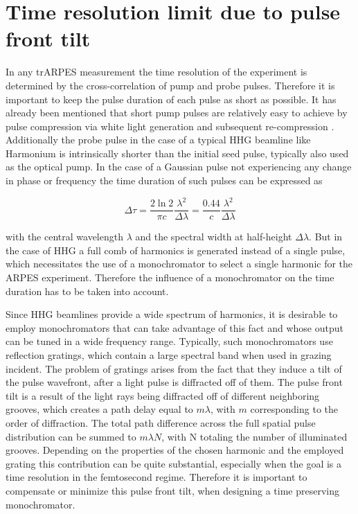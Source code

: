 \section{Time resolution limit due to pulse front tilt}

In any trARPES measurement the time resolution of the experiment is determined by the cross-correlation of pump and probe pulses.
Therefore it is important to keep the pulse duration of each pulse as short as possible.
It has already been mentioned that short pump pulses are relatively easy to achieve by pulse compression via white light generation and subsequent re-compression \cite{nisoli_compression_1997}.
Additionally the probe pulse in the case of a typical HHG beamline like Harmonium is intrinsically shorter than the initial seed pulse, typically also used as the optical pump.
In the case of a Gaussian pulse not experiencing any change in phase or frequency the time duration of such pulses can be expressed as

\begin{equation}
	\Delta\tau = \frac{2 \ln{2}}{\pi c}\frac{\lambda^2}{\Delta\lambda} = \frac{0.44}{c}\frac{\lambda^2}{\Delta\lambda}
\end{equation}

with the central wavelength $\lambda$ and the spectral width at half-height $\Delta\lambda$.
But in the case of HHG a full comb of harmonics is generated instead of a single pulse, which necessitates the use of a monochromator to select a single harmonic for the ARPES experiment.
Therefore the influence of a monochromator on the time duration has to be taken into account.

Since HHG beamlines provide a wide spectrum of harmonics, it is desirable to employ monochromators that can take advantage of this fact and whose output can be tuned in a wide frequency range.
Typically, such monochromators use reflection gratings, which contain a large spectral band when used in grazing incident.
The problem of gratings arises from the fact that they induce a tilt of the pulse wavefront, after a light pulse is diffracted off of them.
The pulse front tilt is a result of the light rays being diffracted off of different neighboring grooves, which creates a path delay equal to $m\lambda$, with $m$ corresponding to the order of diffraction.
The total path difference across the full spatial pulse distribution can be summed to $m\lambda N$, with N totaling the number of illuminated grooves.
Depending on the properties of the chosen harmonic and the employed grating this contribution can be quite substantial, especially when the goal is a time resolution in the femtosecond regime.
Therefore it is important to compensate or minimize this pulse front tilt, when designing a time preserving monochromator.


